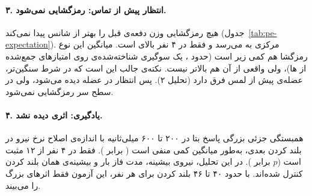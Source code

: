 \begin{table}[H]
\centering
\caption{پاسخ خطا:  روی ۱۲ نفر برای تفاوت پیش‌بینی‌نشده منهای مطابق انتظار هم‌وزن. زمان‌ها نسبت به لمس جسم با هر دو انگشت است. های  روی کانال‌های همسایه و زمان، و های  و نیرو برای هر سیگنال جدا روی زمان ساخته می‌شوند.}
\label{tab:pe-error}
\resizebox{\textwidth}{!}{}
\end{table}



\paragraph{۳. انتظار پیش از تماس: رمزگشایی نمی‌شود.} هیچ رمزگشایی وزن دفعه‌ی قبل را بهتر از شانس پیدا نمی‌کند (جدول~\ref{tab:pe-expectation}).  مرکزی به   می‌رسد و فقط در ۴ نفر بالای  است. میانگین  این نوع رمزگشا هم کمی زیر  است (حدود ، یک سوگیری شناخته‌شده‌ی  روی امتیازهای جمع‌شده از ها)، ولی  واقعی از آن هم بالاتر نیست. نکته‌ی جالب این است که در شرط سنگین‌تر،  عضله‌ی  پیش از لمس فرق دارد (تحلیل ۲). پس انتظار در عضله دیده می‌شود، ولی در  سطح سر رمزگشایی نمی‌شود.

\begin{table}[H]
\centering
\caption{رمزگشایی وزن دفعه‌ی قبل (۱۶۵ در برابر ۶۶۰ گرم) از ۰٫۶ ثانیه‌ی پیش از تماس، یا از ۰٫۵ ثانیه‌ی پیش از . $p$ از آزمون  یک‌طرفه‌ی  بالای  روی ۱۲ نفر.}
\label{tab:pe-expectation}

\end{table}


\paragraph{۴. یادگیری: اثری دیده نشد.} همبستگی جزئی بزرگی پاسخ بتا در ۲۰۰ تا ۶۰۰ میلی‌ثانیه با اندازه‌ی اصلاح نرخ نیرو در بلند کردن بعدی، به‌طور میانگین کمی منفی است ( برابر ). فقط در ۴ نفر از ۱۲ مثبت است ($p$ برابر ). در این تحلیل، نیروی بیشینه، مدت فاز بار و بیشینه‌ی  همان بلند کردن کنترل شده‌اند. با حدود ۴۰ تا ۴۶ بلند کردن برای هر نفر، این آزمون فقط اثرهای بزرگ را می‌بیند.

